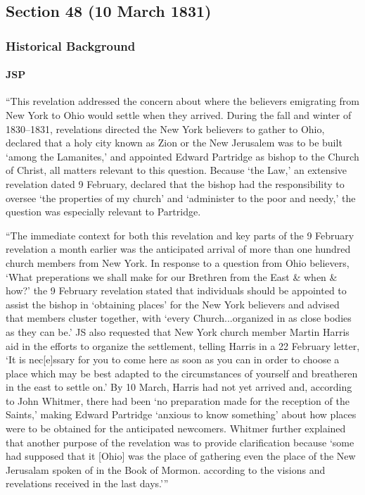 \subsection{Section 48 (10 March 1831)}
	\label{DC48}
	
	\subsubsection{Historical Background}
		\label{DC48-HB}
		
		\paragraph{JSP}
		
			``This revelation addressed the concern about where the believers emigrating from New York to Ohio would settle when they arrived. During the fall and winter of 1830--1831, revelations directed the New York believers to gather to Ohio, declared that a holy city known as Zion or the New Jerusalem was to be built `among the Lamanites,' and appointed Edward Partridge as bishop to the Church of Christ, all matters relevant to this question. Because `the Law,' an extensive revelation dated 9 February, declared that the bishop had the responsibility to oversee `the properties of my church' and `administer to the poor and needy,' the question was especially relevant to Partridge.
			
			``The immediate context for both this revelation and key parts of the 9 February revelation a month earlier was the anticipated arrival of more than one hundred church members from New York. In response to a question from Ohio believers, `What preperations we shall make for our Brethren from the East \& when \& how?' the 9 February revelation stated that individuals should be appointed to assist the bishop in `obtaining places' for the New York believers and advised that members cluster together, with `every Church...organized in as close bodies as they can be.' JS also requested that New York church member Martin Harris aid in the efforts to organize the settlement, telling Harris in a 22 February letter, `It is nec[e]ssary for you to come here as soon as you can in order to choose a place which may be best adapted to the circumstances of yourself and breatheren in the east to settle on.' By 10 March, Harris had not yet arrived and, according to John Whitmer, there had been `no preparation made for the reception of the Saints,' making Edward Partridge `anxious to know something' about how places were to be obtained for the anticipated newcomers. Whitmer further explained that another purpose of the revelation was to provide clarification because `some had supposed that it [Ohio] was the place of gathering even the place of the New Jerusalam spoken of in the Book of Mormon. according to the visions and revelations received in the last days.'''
		
